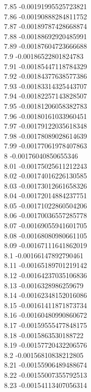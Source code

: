 {7.85	-0.00191995525723821\\
7.86	-0.00190888284811752\\
7.87	-0.00189787428668874\\
7.88	-0.00188692920485991\\
7.89	-0.00187604723666688\\
7.9	-0.00186522801824783\\
7.91	-0.00185447118784329\\
7.92	-0.00184377638577386\\
7.93	-0.00183314325443707\\
7.94	-0.00182257143828507\\
7.95	-0.00181206058382783\\
7.96	-0.00180161033960451\\
7.97	-0.00179122035618348\\
7.98	-0.00178089028614639\\
7.99	-0.00177061978407863\\
8	-0.00176040850655346\\
8.01	-0.00175025611212243\\
8.02	-0.00174016226130585\\
8.03	-0.00173012661658326\\
8.04	-0.00172014884237751\\
8.05	-0.00171022860504206\\
8.06	-0.00170036557285778\\
8.07	-0.00169055941601705\\
8.08	-0.00168080980661105\\
8.09	-0.00167111641862019\\
8.1	-0.00166147892790461\\
8.11	-0.00165189701219142\\
8.12	-0.00164237035106836\\
8.13	-0.0016328986259679\\
8.14	-0.00162348152016086\\
8.15	-0.00161411871873734\\
8.16	-0.00160480990860672\\
8.17	-0.00159555477848175\\
8.18	-0.0015863530188722\\
8.19	-0.00157720432206576\\
8.2	-0.00156810838212805\\
8.21	-0.00155906489488674\\
8.22	-0.00155007355792513\\
8.23	-0.00154113407056314\\
}
